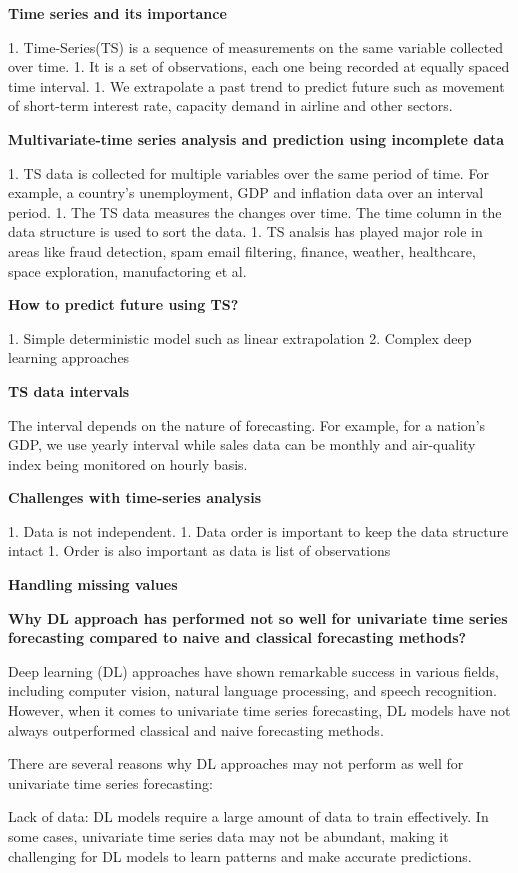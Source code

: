 \textbf{Time series and its importance}

1. Time-Series(TS) is a sequence of measurements on the same variable collected over time.
1. It is a set of observations, each one being recorded at equally spaced time interval.
1. We extrapolate a past trend to predict future such as movement of short-term interest rate, capacity demand in airline and other sectors.

\textbf{Multivariate-time series analysis and prediction using incomplete data}

1. TS data is collected for multiple variables over the same period of time. For example, a country's unemployment, GDP and inflation data over an interval period.
1. The TS data measures the changes over time. The time column in the data structure is used to sort the data.
1. TS analsis has played major role in areas like fraud detection, spam email filtering, finance, weather, healthcare, space exploration, manufactoring et al.

\textbf{How to predict future using TS?}

1. Simple deterministic model such as linear extrapolation
2. Complex deep learning approaches

\textbf{TS data intervals}

The interval depends on the nature of forecasting. For example, for a nation's GDP, we use yearly interval while sales data can be monthly and air-quality index being monitored on hourly basis.

\textbf{Challenges with time-series analysis}

1. Data is not independent.
1. Data order is important to keep the data structure intact
1. Order is also important as data is list of observations

\textbf{Handling missing values}

\textbf{Why DL approach has performed not so well for univariate time series forecasting compared to naive and classical forecasting methods?}

Deep learning (DL) approaches have shown remarkable success in various fields, including computer vision, natural language processing, and speech recognition. However, when it comes to univariate time series forecasting, DL models have not always outperformed classical and naive forecasting methods.

There are several reasons why DL approaches may not perform as well for univariate time series forecasting:

Lack of data: DL models require a large amount of data to train effectively. In some cases, univariate time series data may not be abundant, making it challenging for DL models to learn patterns and make accurate predictions.

